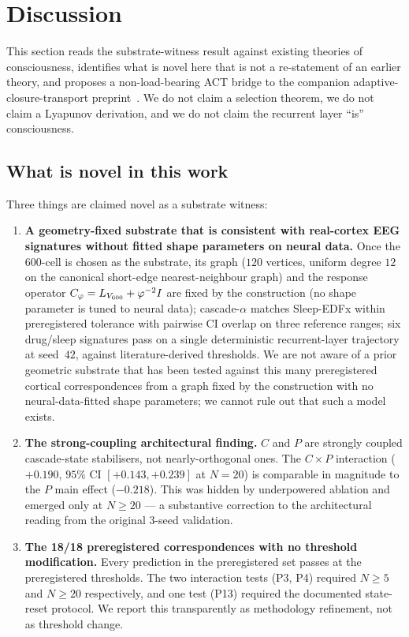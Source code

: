 \section{Discussion}\label{sec:discussion}

This section reads the substrate-witness result against existing
theories of consciousness, identifies what is novel here that is not
a re-statement of an earlier theory, and proposes a non-load-bearing
ACT bridge to the companion adaptive-closure-transport
preprint~\citep{SmartAdaptiveClosureTransport2026}. We do not claim a
selection theorem, we do not claim a Lyapunov derivation, and we do
not claim the recurrent layer ``is'' consciousness.

\subsection{What is novel in this work}

Three things are claimed novel as a substrate witness:
\begin{enumerate}\itemsep=2pt
\item \textbf{A geometry-fixed substrate that is consistent with
  real-cortex EEG signatures without fitted shape parameters on neural
  data.} Once the 600-cell is chosen as the substrate, its graph
  ($120$ vertices, uniform degree $12$ on the canonical short-edge
  nearest-neighbour graph) and the response operator
  $C_{\varphi} = L_{V_{600}} + \varphi^{-2} I$ are fixed by the construction (no
  shape parameter is tuned to neural data); cascade-$\alpha$ matches
  Sleep-EDFx within preregistered tolerance with pairwise CI overlap
  on three reference ranges; six drug/sleep signatures pass on a
  single deterministic recurrent-layer trajectory at seed~$42$,
  against literature-derived thresholds.
  We are not aware of a prior geometric substrate that has been tested
  against this many preregistered cortical correspondences from a
  graph fixed by the construction with no neural-data-fitted shape
  parameters; we cannot rule out that such a model exists.
\item \textbf{The strong-coupling architectural finding.} $C$ and $P$
  are strongly coupled cascade-state stabilisers, not
  nearly-orthogonal ones. The $C\!\times\!P$ interaction
  ($+0.190$, $95\%$ CI $[+0.143, +0.239]$ at $N\!=\!20$) is comparable
  in magnitude to the $P$ main effect ($-0.218$). This was hidden by
  underpowered ablation and emerged only at $N\!\geq\!20$ — a
  substantive correction to the architectural reading from the
  original 3-seed validation.
\item \textbf{The 18/18 preregistered correspondences with no
  threshold modification.} Every prediction in the preregistered set
  passes at the preregistered thresholds. The two interaction tests
  (P3, P4) required $N\!\geq\!5$ and $N\!\geq\!20$ respectively, and
  one test (P13) required the documented state-reset protocol. We
  report this transparently as methodology refinement, not as
  threshold change.
\end{enumerate}

